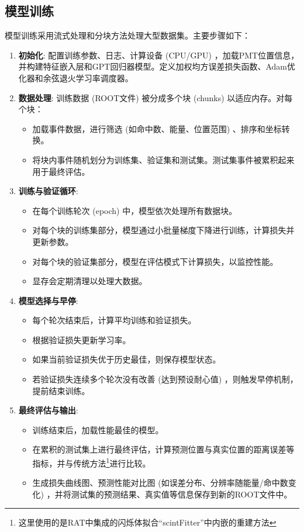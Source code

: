 \subsection{模型训练}

模型训练采用流式处理和分块方法处理大型数据集。主要步骤如下：

\begin{enumerate}
    \item \textbf{初始化}: 配置训练参数、日志、计算设备 (CPU/GPU) ，加载PMT位置信息，并构建特征嵌入层和GPT回归器模型。定义加权均方误差损失函数、Adam优化器和余弦退火学习率调度器。
    \item \textbf{数据处理}: 训练数据 (ROOT文件) 被分成多个块 (chunks) 以适应内存。对每个块：
        \begin{itemize}
            \item 加载事件数据，进行筛选 (如命中数、能量、位置范围) 、排序和坐标转换。
            \item 将块内事件随机划分为训练集、验证集和测试集。测试集事件被累积起来用于最终评估。
        \end{itemize}
    \item \textbf{训练与验证循环}:
        \begin{itemize}
            \item 在每个训练轮次 (epoch) 中，模型依次处理所有数据块。
            \item 对每个块的训练集部分，模型通过小批量梯度下降进行训练，计算损失并更新参数。
            \item 对每个块的验证集部分，模型在评估模式下计算损失，以监控性能。
            \item 显存会定期清理以处理大数据。
        \end{itemize}
    \item \textbf{模型选择与早停}:
        \begin{itemize}
            \item 每个轮次结束后，计算平均训练和验证损失。
            \item 根据验证损失更新学习率。
            \item 如果当前验证损失优于历史最佳，则保存模型状态。
            \item 若验证损失连续多个轮次没有改善 (达到预设耐心值) ，则触发早停机制，提前结束训练。
        \end{itemize}
    \item \textbf{最终评估与输出}:
        \begin{itemize}
            \item 训练结束后，加载性能最佳的模型。
            \item 在累积的测试集上进行最终评估，计算预测位置与真实位置的距离误差等指标，并与传统方法\footnote{这里使用的是RAT中集成的闪烁体拟合“scintFitter”中内嵌的重建方法}进行比较。
            \item 生成损失曲线图、预测性能对比图 (如误差分布、分辨率随能量/命中数变化) ，并将测试集的预测结果、真实值等信息保存到新的ROOT文件中。
        \end{itemize}
\end{enumerate}

